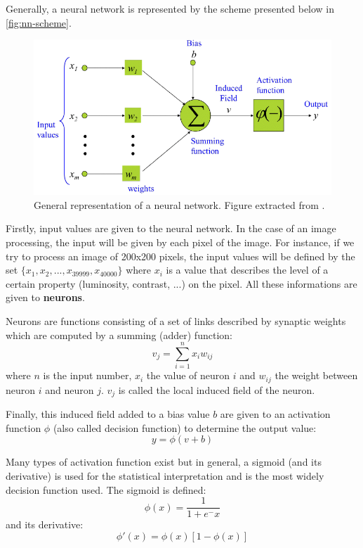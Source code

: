 \documentclass[11pt, openany]{report}
\theoremstyle{plain}
\theoremstyle{definition}
\theoremstyle{remark}
\begin{document}
Generally, a neural network is represented by the scheme presented below in \autoref{fig:nn-scheme}.

\begin{figure}[h]
  \centering
  \includegraphics[scale=0.7]{figures/nn-scheme.png}
  \caption{General representation of a neural network. Figure extracted from \cite{neuralnet-course-1}.}
  \label{fig:nn-scheme}
\end{figure}

\newpage
Firstly, input values are given to the neural network. In the case of an image processing, the input will be given by each pixel of the image. For instance, if we try to process an image of 200x200 pixels, the input values will be defined by the set $\{x_{1}, x_{2}, ... , x_{39999}, x_{40000}\}$ where $x_{i}$ is a value that describes the level of a certain property (luminosity, contrast, ...) on the pixel. All these informations are given to \textbf{neurons}.

Neurons are functions consisting of a set of links described by synaptic weights which are computed by a summing (adder) function: 
$$ v_{j} = \sum_{i=1}^{n} x_{i} w_{ij} $$ where $n$ is the input number, $x_{i}$ the value of neuron $i$ and $w_{ij}$ the weight between neuron $i$ and neuron $j$. $v_{j}$ is called the local induced field of the neuron. 

Finally, this induced field added to a bias value $b$ are given to an activation function  $\phi$ (also called decision function) to determine the output value: 
$$ y = \phi(v + b)$$

Many types of activation function exist but in general, a sigmoid (and its derivative) is used for the statistical interpretation and is the most widely decision function used. The sigmoid is defined: 
$$ \phi(x) = \frac{1}{1+e^-x} $$ 
and its derivative:
$$ \phi'(x) = \phi(x)[1-\phi(x)] $$ 
\end{document}
